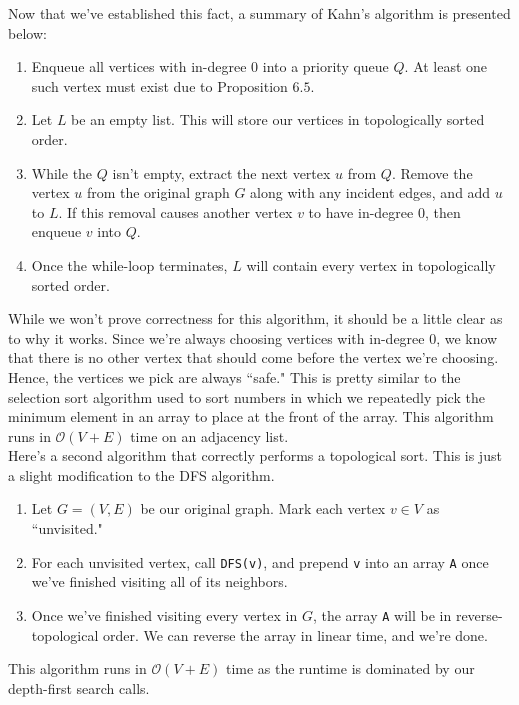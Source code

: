 Now that we've established this fact, a summary of Kahn's algorithm is presented below:

\begin{enumerate}
    \item Enqueue all vertices with in-degree $0$ into a priority queue $Q$. At least one such vertex must exist due to Proposition $6.5$. 
    \item Let $L$ be an empty list. This will store our vertices in topologically sorted order. 
    \item While the $Q$ isn't empty, extract the next vertex $u$ from $Q$. Remove the vertex $u$ from the original graph $G$ along with any incident edges, and add $u$ to $L$. If this removal causes another vertex $v$ to have in-degree $0$, then enqueue $v$ into $Q$. 
    \item Once the while-loop terminates, $L$ will contain every vertex in topologically sorted order. 
\end{enumerate}


While we won't prove correctness for this algorithm, it should be a little clear as to why it works. Since we're always choosing vertices with in-degree $0$, we know that there is no other vertex that should come before the vertex we're choosing. Hence, the vertices we pick are always ``safe." This is pretty similar to the selection sort algorithm used to sort numbers in which we repeatedly pick the minimum element in an array to place at the front of the array. This algorithm runs in $\mathcal{O}(V + E)$ time on an adjacency list. \\


Here's a second algorithm that correctly performs a topological sort. This is just a slight modification to the DFS algorithm. 

\begin{enumerate}
    \item Let $G = (V, E)$ be our original graph. Mark each vertex $v\in V$ as ``unvisited." 
    \item For each unvisited vertex, call \verb!DFS(v)!, and 
    prepend \verb!v! into an array \verb!A! once we've finished visiting all of its neighbors. 
    \item Once we've finished visiting every vertex in $G$, the array \verb!A! will be in reverse-topological order. We can reverse the array in linear time, and we're done. 
\end{enumerate}

This algorithm runs in $\mathcal{O}(V + E)$ time as the runtime is dominated by our depth-first search calls. \\


